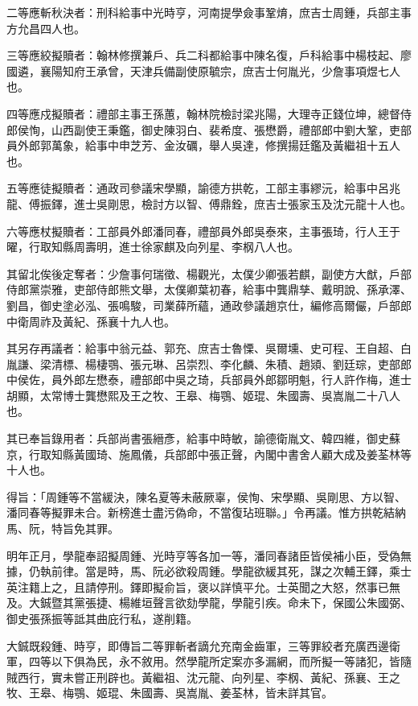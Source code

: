 \begin{pinyinscope}
二等應斬秋決者：刑科給事中光時亨，河南提學僉事鞏焴，庶吉士周鍾，兵部主事方允昌四人也。

三等應絞擬贖者：翰林修撰兼戶、兵二科都給事中陳名復，戶科給事中楊枝起、廖國遴，襄陽知府王承曾，天津兵備副使原毓宗，庶吉士何胤光，少詹事項煜七人也。

四等應戍擬贖者：禮部主事王孫蕙，翰林院檢討梁兆陽，大理寺正錢位坤，總督侍郎侯恂，山西副使王秉鑑，御史陳羽白、裴希度、張懋爵，禮部郎中劉大鞏，吏部員外郎郭萬象，給事中申芝芳、金汝礪，舉人吳達，修撰揚廷鑑及黃繼祖十五人也。

五等應徒擬贖者：通政司參議宋學顯，諭德方拱乾，工部主事繆沅，給事中呂兆龍、傅振鐸，進士吳剛思，檢討方以智、傅鼎銓，庶吉士張家玉及沈元龍十人也。

六等應杖擬贖者：工部員外郎潘同春，禮部員外郎吳泰來，主事張琦，行人王于曜，行取知縣周壽明，進士徐家麒及向列星、李㭎八人也。

其留北俟後定奪者：少詹事何瑞徵、楊觀光，太僕少卿張若麒，副使方大猷，戶部侍郎黨崇雅，吏部侍郎熊文舉，太僕卿葉初春，給事中龔鼎孳、戴明說、孫承澤、劉昌，御史塗必泓、張鳴駿，司業薛所蘊，通政參議趙京仕，編修高爾儼，戶部郎中衛周祚及黃紀、孫襄十九人也。

其另存再議者：給事中翁元益、郭充、庶吉士魯慄、吳爾壎、史可程、王自超、白胤謙、梁清標、楊棲鶚、張元琳、呂崇烈、李化麟、朱積、趙熲、劉廷琮，吏部郎中侯佐，員外郎左懋泰，禮部郎中吳之琦，兵部員外郎鄒明魁，行人許作梅，進士胡顯，太常博士龔懋熙及王之牧、王皋、梅鶚、姬琨、朱國壽、吳嵩胤二十八人也。

其已奉旨錄用者：兵部尚書張縉彥，給事中時敏，諭德衛胤文、韓四維，御史蘇京，行取知縣黃國琦、施鳳儀，兵部郎中張正聲，內閣中書舍人顧大成及姜荃林等十人也。

得旨：「周鍾等不當緩決，陳名夏等未蔽厥辜，侯恂、宋學顯、吳剛思、方以智、潘同春等擬罪未合。新榜進士盡污偽命，不當復玷班聯。」令再議。惟方拱乾結納馬、阮，特旨免其罪。

明年正月，學龍奉詔擬周鍾、光時亨等各加一等，潘同春諸臣皆侯補小臣，受偽無據，仍執前律。當是時，馬、阮必欲殺周鍾。學龍欲緩其死，謀之次輔王鐸，乘士英注籍上之，且請停刑。鐸即擬俞旨，褒以詳慎平允。士英聞之大怒，然事已無及。大鋮暨其黨張捷、楊維垣聲言欲劾學龍，學龍引疾。命未下，保國公朱國弼、御史張孫振等詆其曲庇行私，遂削籍。

大鋮既殺鍾、時亨，即傳旨二等罪斬者謫允充南金齒軍，三等罪絞者充廣西邊衛軍，四等以下俱為民，永不敘用。然學龍所定案亦多漏網，而所擬一等諸犯，皆隨賊西行，實未嘗正刑辟也。黃繼祖、沈元龍、向列星、李㭎、黃紀、孫襄、王之牧、王皋、梅鶚、姬琨、朱國壽、吳嵩胤、姜荃林，皆未詳其官。


\end{pinyinscope}
